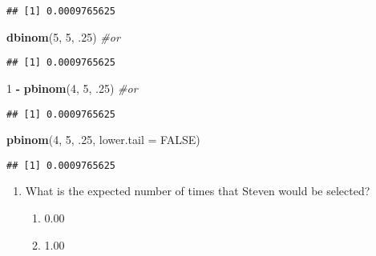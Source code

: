 \documentclass[]{article}
\newenvironment{Shaded}{\begin{snugshade}}{\end{snugshade}}
\newcommand{\KeywordTok}[1]{\textcolor[rgb]{0.13,0.29,0.53}{\textbf{#1}}}
\newcommand{\DataTypeTok}[1]{\textcolor[rgb]{0.13,0.29,0.53}{#1}}
\newcommand{\DecValTok}[1]{\textcolor[rgb]{0.00,0.00,0.81}{#1}}
\newcommand{\StringTok}[1]{\textcolor[rgb]{0.31,0.60,0.02}{#1}}
\newcommand{\CommentTok}[1]{\textcolor[rgb]{0.56,0.35,0.01}{\textit{#1}}}
\newcommand{\OtherTok}[1]{\textcolor[rgb]{0.56,0.35,0.01}{#1}}
\newcommand{\OperatorTok}[1]{\textcolor[rgb]{0.81,0.36,0.00}{\textbf{#1}}}
\newcommand{\NormalTok}[1]{#1}
\providecommand{\tightlist}{%
  \setlength{\itemsep}{0pt}\setlength{\parskip}{0pt}}
\begin{document}
\begin{verbatim}
## [1] 0.0009765625
\end{verbatim}

\begin{Shaded}
\begin{Highlighting}[]
\KeywordTok{dbinom}\NormalTok{(}\DecValTok{5}\NormalTok{, }\DecValTok{5}\NormalTok{, .}\DecValTok{25}\NormalTok{) }\CommentTok{#or}
\end{Highlighting}
\end{Shaded}

\begin{verbatim}
## [1] 0.0009765625
\end{verbatim}

\begin{Shaded}
\begin{Highlighting}[]
\DecValTok{1} \OperatorTok{-}\StringTok{ }\KeywordTok{pbinom}\NormalTok{(}\DecValTok{4}\NormalTok{, }\DecValTok{5}\NormalTok{, .}\DecValTok{25}\NormalTok{) }\CommentTok{#or}
\end{Highlighting}
\end{Shaded}

\begin{verbatim}
## [1] 0.0009765625
\end{verbatim}

\begin{Shaded}
\begin{Highlighting}[]
\KeywordTok{pbinom}\NormalTok{(}\DecValTok{4}\NormalTok{, }\DecValTok{5}\NormalTok{, .}\DecValTok{25}\NormalTok{, }\DataTypeTok{lower.tail =} \OtherTok{FALSE}\NormalTok{)}
\end{Highlighting}
\end{Shaded}

\begin{verbatim}
## [1] 0.0009765625
\end{verbatim}

\begin{enumerate}
\def\labelenumi{\arabic{enumi}.}
\setcounter{enumi}{28}
\item
  What is the expected number of times that Steven would be selected?

  \begin{enumerate}
  \def\labelenumii{\alph{enumii}.}
  \tightlist
  \item
    0.00
  \item
    1.00
  \end{enumerate}
\end{enumerate}
\end{document}

